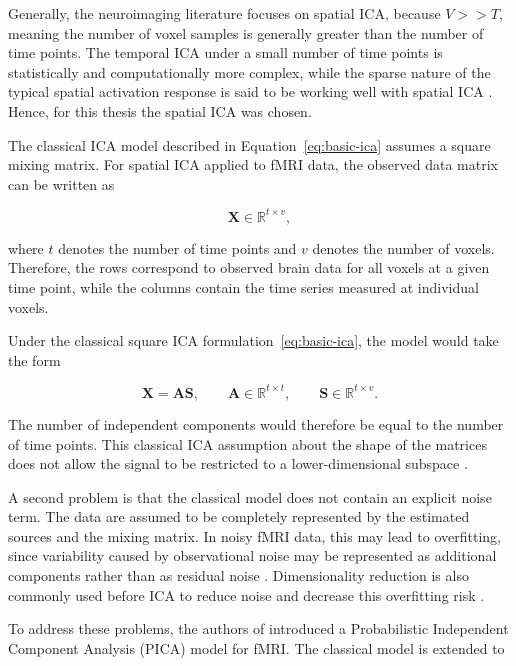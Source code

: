 \documentclass[english]{pwr_wmat_praca_dyplomowa}
\theoremstyle{definition}
\theoremstyle{remark}
\begin{document}
Generally, the neuroimaging literature focuses on spatial ICA, because $V >> T$, meaning the number of voxel samples is generally greater than the number of time points. The temporal ICA under a small number of time points is statistically and computationally more complex, while the sparse nature of the typical spatial activation response is said to be working well with spatial ICA \cite{spatial-temporal-ica}. Hence, for this thesis the spatial ICA was chosen.

The classical ICA model described in Equation~\eqref{eq:basic-ica} assumes a square mixing matrix. For spatial ICA applied to fMRI data, the observed data matrix can be written as

\begin{equation}
    \mathbf{X} \in \mathbb{R}^{t \times v},
\end{equation}

where $t$ denotes the number of time points and $v$ denotes the number of voxels. Therefore, the rows correspond to observed brain data for all voxels at a given time point, while the columns contain the time series measured at individual voxels.


\newpage
Under the classical square ICA formulation~\eqref{eq:basic-ica}, the model would take the form

\begin{equation}
    \mathbf{X} = \mathbf{A}\mathbf{S},
    \qquad \mathbf{A} \in \mathbb{R}^{t\times t},
    \qquad \mathbf{S} \in \mathbb{R}^{t\times v}.
\end{equation}

The number of independent components would therefore be equal to the number of time points. This classical ICA assumption about the shape of the matrices does not allow the signal to be restricted to a lower-dimensional subspace \cite{pica}.

A second problem is that the classical model does not contain an explicit noise term. The data are assumed to be completely represented by the estimated sources and the mixing matrix. In noisy fMRI data, this may lead to overfitting, since variability caused by observational noise may be represented as additional components rather than as residual noise \cite{pica}. Dimensionality reduction is also commonly used before ICA to reduce noise and decrease this overfitting risk \cite[Section 13.2]{ica}.

To address these problems, the authors of \cite{pica} introduced a Probabilistic Independent Component Analysis (PICA) model for fMRI. The classical model is extended to
\end{document}
